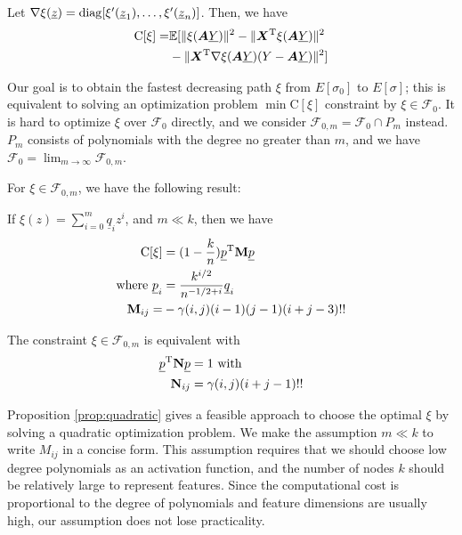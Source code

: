 \documentclass[appliedmath,article,accept,pdftex,moreauthors]{Definitions/mdpi}
\begin{document}
\begin{Proposition}\label{prop:Esigma} 
Let $\nabla \xi(\underline{z})  = \operatorname*{diag}[\xi'(\underline{z}_1), \dots, \xi'(\underline{z}_n)]$. Then, we have
\begin{align}\notag
\mathrm{C}[\xi]= & \mathbb{E}[\lVert\xi(\bm{A}\underline{Y})\rVert^2 -
\lVert\bm{X}^{\mathrm{T}}\xi(\bm{A}\underline{Y})\rVert^2 \\
&- \lVert\bm{X}^{\mathrm{T}} \nabla\xi(\bm{A}\underline{Y})(Y-\bm{A}\underline{Y})\rVert^2]
\end{align}
\end{Proposition}

Our goal is to obtain the fastest decreasing path $\xi$ from $E[\sigma_0]$ to $E[\sigma]$; this is equivalent to solving an optimization problem $\min \mathrm{C}[\xi]$ constraint by $\xi \in \mathcal{F}_0$.
It is hard to optimize $\xi$ over $\mathcal{F}_0$ directly, and we consider $\mathcal{F}_{0,m} = \mathcal{F}_0 \cap P_m$ instead. $P_m$ consists of polynomials with the degree no greater than $m$, and we have $\mathcal{F}_0 = \lim_{m\to \infty} \mathcal{F}_{0,m}$.

For $\xi \in \mathcal{F}_{0,m}$, we have the following result:
\begin{Proposition}\label{prop:quadratic}
If
$\xi(z) = \sum_{i=0}^m \underline{q}_i z^i$,
and $m \ll k$, then we have 
\begin{align}
\mathrm{C}[\xi] &= (1-\frac{k}{n}) \underline{p}^{\mathrm{T}} \mathbf{M} \underline{p} \notag\\
\textrm{where }\underline{p}_i &= \frac{k^{i/2}}{n^{- 1/2 + i}}\underline{q}_i\label{eq:pqt} \\
\mathbf{M}_{ij} =& -\gamma(i,j)(i-1)(j-1)(i+j-3)!! \notag
\end{align}

{The} constraint $\xi \in \mathcal{F}_{0,m}$ is equivalent with
\begin{align}
\underline{p}^{\mathrm{T}} \mathbf{N} \underline{p} & = 1 \textrm{ with }\notag\\
\mathbf{N}_{ij}  & = \gamma(i,j)(i+j-1)!!
\end{align}
\end{Proposition}

Proposition \ref{prop:quadratic} gives a feasible approach to choose the optimal $\xi$ by solving a quadratic optimization problem. We make the assumption $
m \ll k$ to write $M_{ij}$ in a concise form. This assumption requires that we should choose low degree polynomials as an activation function, and the number of nodes $k$ should be relatively large to represent features. Since the computational cost
is proportional to the degree of polynomials and feature dimensions are usually high, our assumption does not lose practicality. 
\end{document}
